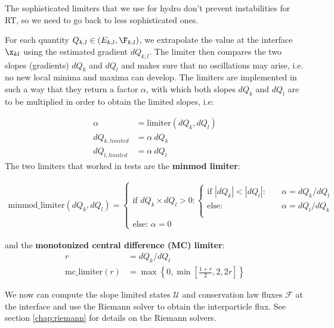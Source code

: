 
The sophisticated limiters that we use for hydro don't prevent instabilities for 
RT, so we need to go back to less sophisticated ones.


For each quantity $Q_{k,l} \in (E_{k,l}, \F_{k,l})$, we extrapolate the value at the interface
$\x_{kl}$ using the estimated gradient $dQ_{k,l}$. The limiter then compares the two slopes
(gradients) $dQ_k$ and $dQ_l$ and makes sure that no oscillations may arise, i.e. no new local
minima and maxima can develop. The limiters are implemented in such a way that they return a factor
$\alpha$, with which both slopes $dQ_k$ and $dQ_l$ are to be multiplied in order to obtain the
limited slopes, i.e:

\begin{align}
	\alpha &= \text{limiter}(dQ_k, dQ_l)\\
	dQ_{k, limited} &= \alpha\ dQ_k\\
	dQ_{l, limited} &= \alpha\ dQ_l
\end{align}
The two limiters that worked in tests are the \textbf{minmod limiter}:

\begin{align}
	\text{minmod\_limiter}(dQ_k, dQ_l) =
		\begin{cases}
		\text{if } dQ_k \times dQ_l > 0:
			\begin{cases}
				\text{if } |dQ_k| < |dQ_l| :\quad &\alpha = dQ_k / dQ_l \\
				\text{else: } &\alpha = dQ_l / dQ_k\\
			\end{cases}\\
			\text{else: } \alpha = 0
		\end{cases}
\end{align}

and the \textbf{monotonized central difference (MC) limiter}:
\begin{align}
	r &= dQ_k / dQ_l \\
	\text{mc\_limiter}(r) &= \max \left\{ 0, \min\left[\frac{1 + r}{2}, 2, 2r \right] \right\}
\end{align}

We now can compute the slope limited states $\mathcal{U}$ and conservation law fluxes $\mathcal{F}$
at the interface and use the Riemann solver to obtain the interparticle flux.
See section \ref{chap:riemann} for details on the Riemann solvers.

